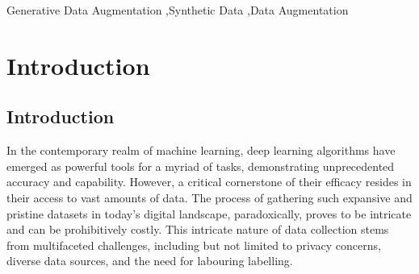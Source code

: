 \documentclass[preprint,12pt,authoryear]{elsarticle}
\begin{document}
\begin{frontmatter}


\begin{keyword}

 

 
 Generative Data Augmentation \sep Synthetic Data \sep Data Augmentation



\end{keyword}

\end{frontmatter}

\clearpage
\tableofcontents
\clearpage
\section{Introduction}
\label{Introduction}
\subsection{Introduction}
In the contemporary realm of machine learning, deep learning algorithms have emerged as powerful tools for a myriad of tasks, demonstrating unprecedented accuracy and capability.\cite{1_deep_learning,2_deep_learning,3_deep_learning} However, a critical cornerstone of their efficacy resides in their access to vast amounts of data\cite{4_high_data,5_high_data,6_high_data}. The process of gathering such expansive and pristine datasets in today's digital landscape, paradoxically, proves to be intricate and can be prohibitively costly. This intricate nature of data collection stems from multifaceted challenges, including but not limited to privacy concerns\cite{7_privacy,8_privacy}, diverse data sources, and the need for labouring labelling\cite{9_labelling_diffusion}. 
\end{document}
